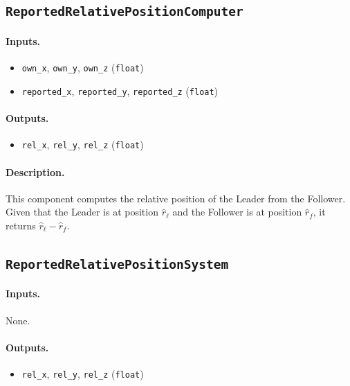 \documentclass{article}
\begin{document}
\subsection{\texttt{ReportedRelativePositionComputer}}

\paragraph{Inputs.}
\begin{itemize}
    \item \verb|own_x|, \verb|own_y|, \verb|own_z| (\verb|float|)
    \item \verb|reported_x|, \verb|reported_y|, \verb|reported_z| (\verb|float|)
\end{itemize}

\paragraph{Outputs.}
\begin{itemize}
    \item \verb|rel_x|, \verb|rel_y|, \verb|rel_z| (\verb|float|)
\end{itemize}

\paragraph{Description.} This component computes the relative position of the Leader from the Follower. Given that the Leader is at position $\hat r_\ell$ and the Follower is at position $\hat r_f$, it returns $\hat r_\ell - \hat r_f$.

\subsection{\texttt{ReportedRelativePositionSystem}}

\paragraph{Inputs.} None.

\paragraph{Outputs.}
\begin{itemize}
    \item \verb|rel_x|, \verb|rel_y|, \verb|rel_z| (\verb|float|)
\end{itemize}
\end{document}
